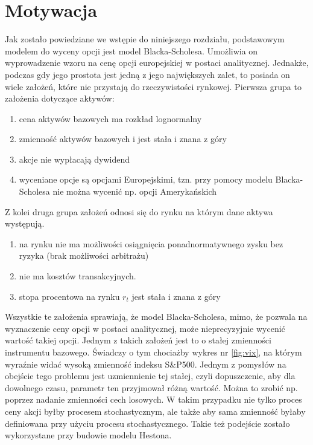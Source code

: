 \documentclass{pracamgr}
\begin{document}
\section{Motywacja} 
Jak zostało powiedziane we wstępie do niniejszego rozdziału, podstawowym modelem do wyceny opcji jest model Blacka-Scholesa.
Umożliwia on wyprowadzenie wzoru na cenę opcji europejskiej w postaci analitycznej. Jednakże, podczas gdy jego prostota jest jedną z jego największych zalet, to posiada on wiele założeń, które nie przystają do rzeczywistości rynkowej. Pierwsza grupa to założenia dotyczące aktywów:
\begin{enumerate}
\item cena aktywów bazowych ma rozkład lognormalny
\item zmienność aktywów bazowych i jest stała i znana z góry
\item akcje nie wypłacają dywidend
\item wyceniane opcje są opcjami Europejskimi, tzn. przy pomocy modelu Blacka-Scholesa nie można wycenić np. opcji Amerykańskich
\end{enumerate}
Z kolei druga grupa założeń odnosi się do rynku na którym dane aktywa występują.
\begin{enumerate}
\item na rynku nie ma możliwości osiągnięcia ponadnormatywnego zysku bez ryzyka (brak możliwości arbitrażu)
\item nie ma kosztów transakcyjnych.
\item stopa procentowa na rynku $r_t$ jest stała i znana z góry 
\end{enumerate}

Wszystkie te założenia sprawiają, że model Blacka-Scholesa, mimo, że pozwala na wyznaczenie ceny opcji w postaci analitycznej, może nieprecyzyjnie wycenić wartość takiej opcji.
Jednym z takich założeń jest to o stałej zmienności instrumentu bazowego. Świadczy o tym chociażby
wykres nr \ref{fig:vix}, na którym wyraźnie widać wysoką zmienność indeksu S\&P500. Jednym z pomysłów na obejście tego problemu jest uzmiennienie tej stałej, czyli dopuszczenie, aby dla dowolnego czasu, parametr ten przyjmował różną wartość. Można to zrobić np. poprzez nadanie zmienności cech losowych. W takim przypadku nie tylko proces ceny akcji byłby procesem stochastycznym, ale także aby sama zmienność byłaby definiowana przy użyciu procesu stochastycznego. Takie też podejście zostało wykorzystane przy budowie modelu Hestona. \cite{greenwade93}
\end{document}
